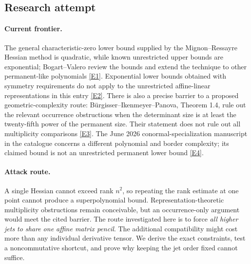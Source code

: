 \documentclass[11pt,a4paper]{article}
\newcommand{\eref}[2]{\hyperlink{extra:#1:#2}{[E#2]}}
\numberwithin{equation}{section}
\begin{document}
\subsection{Research attempt}

\paragraph{Current frontier.}
The general characteristic-zero lower bound supplied by the Mignon--Ressayre Hessian method is quadratic, while known unrestricted upper bounds are exponential; Bogart--Valero review the bounds and extend the technique to other permanent-like polynomials \eref{57}{1}. Exponential lower bounds obtained with symmetry requirements do not apply to the unrestricted affine-linear representations in this entry \eref{57}{2}. There is also a precise barrier to a proposed geometric-complexity route: B\"urgisser--Ikenmeyer--Panova, Theorem 1.4, rule out the relevant occurrence obstructions when the determinant size is at least the twenty-fifth power of the permanent size. Their statement does not rule out all multiplicity comparisons \eref{57}{3}. The June 2026 conormal-specialization manuscript in the catalogue concerns a different polynomial and border complexity; its claimed bound is not an unrestricted permanent lower bound \eref{57}{4}.

\paragraph{Attack route.}
A single Hessian cannot exceed rank $n^2$, so repeating the rank estimate at one point cannot produce a superpolynomial bound. Representation-theoretic multiplicity obstructions remain conceivable, but an occurrence-only argument would meet the cited barrier. The route investigated here is to force \emph{all higher jets to share one affine matrix pencil}. The additional compatibility might cost more than any individual derivative tensor. We derive the exact constraints, test a noncommutative shortcut, and prove why keeping the jet order fixed cannot suffice.
\end{document}
